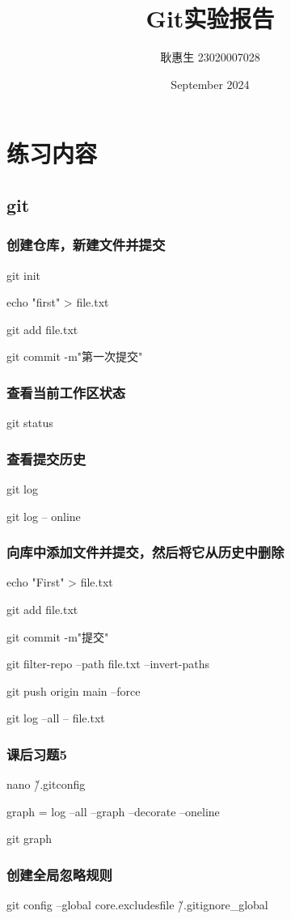 \documentclass{ctexart}
\title{Git实验报告}
\author{耿惠生 23020007028}
\date{September 2024}
\begin{document}
\maketitle

\section{练习内容}
\subsection{git}
\subsubsection{创建仓库，新建文件并提交}
git init

echo "first" > file.txt

git add file.txt

git commit -m"第一次提交"
\subsubsection{查看当前工作区状态}
git status
\subsubsection{查看提交历史}
git log

git log -- online
\subsubsection{向库中添加文件并提交，然后将它从历史中删除}
echo "First" > file.txt

git add file.txt

git commit -m"提交"

git filter-repo --path file.txt --invert-paths 

git push origin main --force

git log --all -- file.txt
\subsubsection{课后习题5}
nano \~/.gitconfig  

graph = log --all --graph --decorate --oneline 

git graph 
\subsubsection{创建全局忽略规则 }
git config --global core.excludesfile \~/.gitignore\_global 
\end{document}
